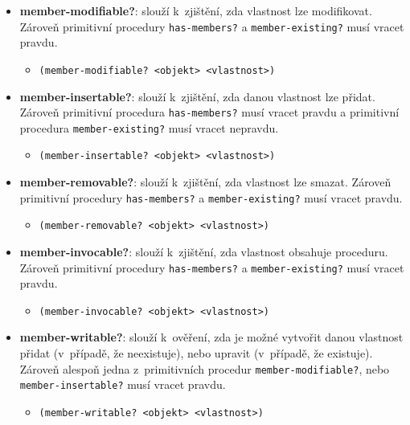 \documentclass[
  master,
  biblatex,
  figures=true,
  theorems,
  sourcecodes,
  glossaries,
  index
]{kidiplom}
\begin{document}
\begin{itemize}
    \item \textbf{member-modifiable?}: slouží k~zjištění, zda vlastnost lze modifikovat. Zároveň primitivní procedury \texttt{has-members?} a \texttt{member-existing?} musí vracet pravdu. 
    \begin{itemize}
        \item \texttt{(member-modifiable? <objekt> <vlastnost>)} 
    \end{itemize}

    \item \textbf{member-insertable?}: slouží k~zjištění, zda danou  vlastnost lze přidat. Zároveň primitivní procedura \texttt{has-members?} musí vracet pravdu a primitivní procedura \texttt{member-existing?} musí vracet nepravdu.
    \begin{itemize}
        \item \texttt{(member-insertable? <objekt> <vlastnost>)} 
    \end{itemize}

    \item \textbf{member-removable?}: slouží k~zjištění, zda vlastnost lze smazat. Zároveň primitivní procedury \texttt{has-members?} a \texttt{member-existing?} musí vracet pravdu. 
    \begin{itemize}
        \item \texttt{(member-removable? <objekt> <vlastnost>)} 
    \end{itemize}

    \item \textbf{member-invocable?}: slouží k~zjištění, zda vlastnost obsahuje proceduru. Zároveň primitivní procedury \texttt{has-members?} a \texttt{member-existing?} musí vracet pravdu. 
    \begin{itemize}
        \item \texttt{(member-invocable? <objekt> <vlastnost>)} 
    \end{itemize}

    \item \textbf{member-writable?}: slouží k~ověření, zda je možné vytvořit danou vlastnost přidat (v~případě, že neexistuje), nebo upravit (v~případě, že existuje). Zároveň alespoň jedna z~primitivních procedur \texttt{member-modifiable?}, nebo \texttt{member-insertable?} musí vracet pravdu. 
    \begin{itemize}
        \item \texttt{(member-writable? <objekt> <vlastnost>)} 
    \end{itemize}


\end{itemize}
\end{document}
